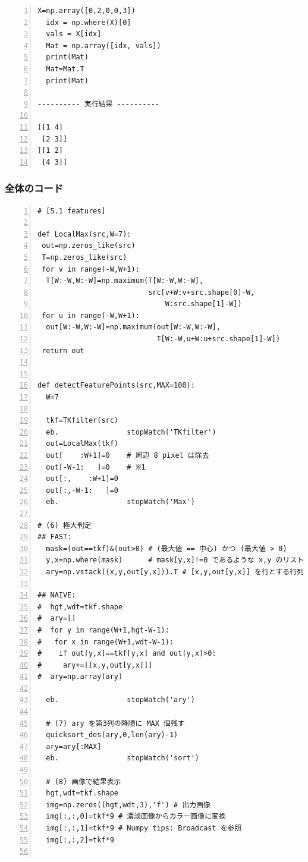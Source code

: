 \documentclass[autodetect-engine,dvi=dvipdfmx,ja=standard,
               a4j,11pt]{bxjsarticle}
\begin{document}
\begin{Verbatim}[numbers=left, xleftmargin=10mm, numbersep=6pt,
                    fontsize=\small, baselinestretch=0.8]
  X=np.array([0,2,0,0,3])
  idx = np.where(X)[0]
  vals = X[idx]
  Mat = np.array([idx, vals])
  print(Mat)
  Mat=Mat.T
  print(Mat)

---------- 実行結果 ----------

[[1 4]
 [2 3]]
[[1 2]
 [4 3]]
\end{Verbatim}



\subsubsection{全体のコード}
\begin{Verbatim}[numbers=left, xleftmargin=10mm, numbersep=6pt,
                    fontsize=\small, baselinestretch=0.8]
# [5.1 features]

def LocalMax(src,W=7):
 out=np.zeros_like(src)
 T=np.zeros_like(src)
 for v in range(-W,W+1):
  T[W:-W,W:-W]=np.maximum(T[W:-W,W:-W],
                          src[v+W:v+src.shape[0]-W,
                              W:src.shape[1]-W])
 for u in range(-W,W+1):
  out[W:-W,W:-W]=np.maximum(out[W:-W,W:-W],
                            T[W:-W,u+W:u+src.shape[1]-W])
 return out


def detectFeaturePoints(src,MAX=100):
  W=7

  tkf=TKfilter(src)
  eb.                stopWatch('TKfilter')
  out=LocalMax(tkf)
  out[    :W+1]=0    # 周辺 8 pixel は除去
  out[-W-1:   ]=0    # ※1
  out[:,    :W+1]=0
  out[:,-W-1:   ]=0
  eb.                stopWatch('Max')

# (6) 極大判定
## FAST:
  mask=(out==tkf)&(out>0) # (最大値 == 中心) かつ (最大値 > 0)
  y,x=np.where(mask)      # mask[y,x]!=0 であるような x,y のリスト
  ary=np.vstack((x,y,out[y,x])).T # [x,y,out[y,x]] を行とする行列

## NAIVE:
#  hgt,wdt=tkf.shape
#  ary=[]
#  for y in range(W+1,hgt-W-1):
#   for x in range(W+1,wdt-W-1):
#    if out[y,x]==tkf[y,x] and out[y,x]>0:
#     ary+=[[x,y,out[y,x]]]
#  ary=np.array(ary)

  eb.                stopWatch('ary')

  # (7) ary を第3列の降順に MAX 個残す
  quicksort_des(ary,0,len(ary)-1)
  ary=ary[:MAX]
  eb.                stopWatch('sort')

  # (8) 画像で結果表示
  hgt,wdt=tkf.shape
  img=np.zeros((hgt,wdt,3),'f') # 出力画像
  img[:,:,0]=tkf*9 # 濃淡画像からカラー画像に変換
  img[:,:,1]=tkf*9 # Numpy tips: Broadcast を参照
  img[:,:,2]=tkf*9


\end{Verbatim}
\end{document}
